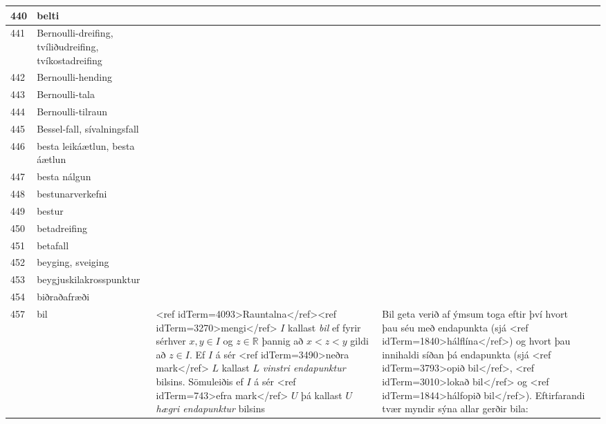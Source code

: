 \begin{longtable}{p{}|p{}|p{}|p{}|p{}}
\hline
440 & belti &  &  &  \\
\hline
441 & Bernoulli-dreifing, tvíliðudreifing, tvíkostadreifing &  &  &  \\
\hline
442 & Bernoulli-hending &  &  &  \\
\hline
443 & Bernoulli-tala &  &  &  \\
\hline
444 & Bernoulli-tilraun &  &  &  \\
\hline
445 & Bessel-fall, sívalningsfall &  &  &  \\
\hline
446 & besta leikáætlun, besta áætlun &  &  &  \\
\hline
447 & besta nálgun &  &  &  \\
\hline
448 & bestunarverkefni &  &  &  \\
\hline
449 & bestur &  &  &  \\
\hline
450 & betadreifing &  &  &  \\
\hline
451 & betafall &  &  &  \\
\hline
452 & beyging, sveiging &  &  &  \\
\hline
453 & beygjuskilakrosspunktur &  &  &  \\
\hline
454 & biðraðafræði &  &  &  \\
\hline
457 & bil & <ref idTerm=4093>Rauntalna</ref><ref idTerm=3270>mengi</ref> $I$ kallast \textit{bil} ef fyrir sérhver $x, y \in I$ og $z \in \mathbb{R}$ þannig að $x < z < y$ gildi að $z \in I$. Ef $I$ á sér <ref idTerm=3490>neðra mark</ref> $L$ kallast $L$ \textit{vinstri endapunktur} bilsins. Sömuleiðis ef $I$ á sér <ref idTerm=743>efra mark</ref> $U$ þá kallast $U$ \textit{hægri endapunktur} bilsins & Bil geta verið af ýmsum toga eftir því hvort þau séu með endapunkta (sjá <ref idTerm=1840>hálflína</ref>) og hvort þau innihaldi síðan þá endapunkta (sjá <ref idTerm=3793>opið bil</ref>, <ref idTerm=3010>lokað bil</ref> og <ref idTerm=1844>hálfopið bil</ref>). Eftirfarandi tvær myndir sýna allar gerðir bila:


\end{longtable}

